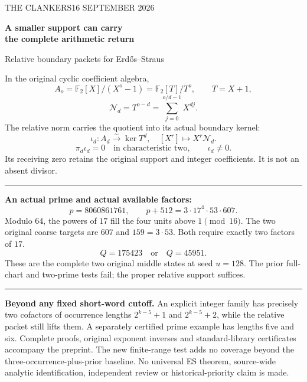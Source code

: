 \documentclass[11pt]{article}
\begin{document}
\noindent\small THE CLANKERS\hfill16 SEPTEMBER 2026
\vspace{4mm}
\begin{center}
{\LARGE\bfseries A smaller support can carry\\[2mm] the complete arithmetic return}\par
\vspace{3mm}
{\large Relative boundary packets for Erd\H{o}s--Straus}
\end{center}
\noindent In the original cyclic coefficient algebra,
\[
 A_o=\mathbb F_2[X]/(X^o-1)=\mathbb F_2[T]/T^o,\qquad T=X+1,
\]
\[
 \boxed{\mathcal N_d=T^{o-d}=\sum_{j=0}^{o/d-1}X^{dj}.}
\]
\noindent The relative norm carries the quotient into its actual boundary kernel:
\[
 \iota_d:A_d\xrightarrow{\sim}\ker T^d,\quad
 [X^r]\longmapsto X^r\mathcal N_d.
\]
\[
 \pi_d\iota_d=0\quad\text{in characteristic two},
 \qquad \iota_d\ne0.
\]
\noindent Its receiving zero retains the original support and integer coefficients.
It is not an absent divisor.
\vspace{3mm}\hrule\vspace{3mm}
\noindent\textbf{An actual prime and actual available factors:}
\[
 p=8060861761,\qquad p+512=3\cdot17^4\cdot53\cdot607.
\]
\noindent Modulo $64$, the powers of $17$ fill the four units above $1\pmod{16}$.
The two original coarse targets are $607$ and $159=3\cdot53$.
Both require exactly two factors of $17$.
\[
 \boxed{Q=175423\quad\text{or}\quad Q=45951.}
\]
\noindent These are the complete two original middle states at seed $u=128$.
The prior full-chart and two-prime tests fail; the proper relative support suffices.
\vspace{3mm}\hrule\vspace{3mm}
\noindent\textbf{Beyond any fixed short-word cutoff.}
An explicit integer family has precisely two cofactors of occurrence lengths
$2^{k-5}+1$ and $2^{k-5}+2$, while the relative packet still lifts them.
A separately certified prime example has lengths five and six.
\vspace{3mm}
\noindent\footnotesize
Complete proofs, original exponent inverses and standard-library certificates
accompany the preprint. The new finite-range test adds no coverage beyond the
three-occurrence-plus-prior baseline. No universal ES theorem, source-wide analytic
identification, independent review or historical-priority claim is made.
\end{document}
